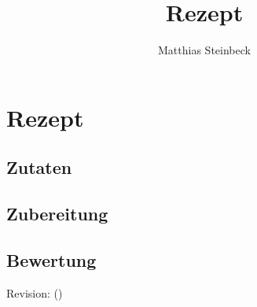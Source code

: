\documentclass[10pt,a4paper]{article}
\author{Matthias Steinbeck}
\title{Rezept}
\begin{document}
%
\section*{Rezept}
\subsection*{Zutaten}
\subsection*{Zubereitung}
\subsection*{Bewertung}
Revision\gitVtags: \gitAbbrevHash{} (\gitAuthorDate)
\end{document}
